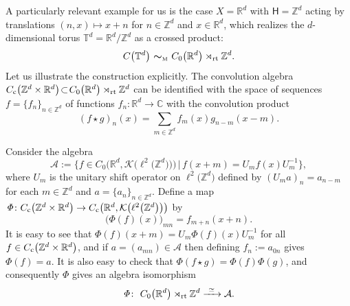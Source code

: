 \documentclass[pdftex]{sigma}
\numberwithin{equation}{section}
\newcommand{\Z}{\zed}
\newcommand{\mbf}[1]{{\boldsymbol {#1} }}
\newcommand{\CK}{\mathcal{K}}
\newcommand{\sfH}{\mathsf{H}}
\newcommand{\rt}{{\rm rt}}
\newcommand{\R}{\real}
\newcommand{\complex}{{\mathbb C}} %
\newcommand{\zed}{{\mathbb Z}} %
\newcommand{\real}{{\mathbb R}} %
\newcommand{\torus}{{\mathbb T}} %
\def\alg{{\mathcal A}}
\begin{document}
\begin{Example}[tori]\label{ex:Moritatori}
A particularly relevant example for us is the case $X=\real^d$ with
$\sfH=\zed^d$ acting by translations $(n,x)\mapsto x+n$ for
$n\in\zed^d$ and $x\in\real^d$, which realizes the
$d$-dimensional torus $\torus^d=\real^d/\zed^d$ as a crossed product:
\[
C\big(\torus^d\big) \ \mbf\sim_{\text{\tiny M}} \ C_0\big(\real^d\big)\rtimes_\rt \zed^d .
\]
Let us illustrate the construction explicitly. The convolution algebra
$C_{\rm c}\big(\Z^d\times\real^d\big)\!\subset\! C_0\big(\R^d\big)\rtimes_\rt\Z^d$ can be
identified with the space of sequences $f=\{f_n\}_{n\in\Z^d}$ of
functions $f_n\colon \real^d\to\complex$ with the convolution product
\[
(f\star g)_n(x) = \sum_{m\in\Z^d} f_m(x) g_{n-m}(x-m) .
\]

Consider the algebra
\[
\alg:=\big\{f\in C_0\big(\real^d,\CK\big(\ell^2\big(\zed^d\big)\big)\big) \, \big| \, f(x+m)
= U_m f(x) U_{m}^{-1}\big\} ,
\]
where $U_m$ is the unitary shift operator on $\ell^2\big(\zed^d\big)$ defined by
$(U_ma)_n=a_{n-m}$ for each $m\in\Z^d$ and $a=\{a_n\}_{n\in\Z^d}$.
Define a map ${\mathit\Phi}\colon C_{\rm c}\big(\Z^d\times\real^d\big)\to
C_{\rm c}\big(\real^d,\CK\big(\ell^2\big(\Z^d\big)\big)\big)$ by
\[
\big({\mathit\Phi}(f)(x)\big)_{mn} = f_{m+n}(x+n) .
\]
It is easy to see that ${\mathit\Phi}(f)(x+m) =
U_m {\mathit\Phi}(f)(x) U_m^{-1}$ for all $f\in C_{\rm
 c}\big(\zed^d\times\real^d\big)$, and if $a=(a_{mn})\in\alg$ then defining
$f_n:=a_{0n}$ gives ${\mathit\Phi}(f)=a$. It is also easy to check that
${\mathit\Phi}(f\star g) = {\mathit\Phi}(f) {\mathit\Phi}(g)$, and consequently
$\mathit\Phi$ gives an algebra isomorphism
\[
{\mathit\Phi}\colon \ C_0\big(\real^d\big)\rtimes_\rt\zed^d \xrightarrow{ \ \simeq \ } \alg .
\]


\end{Example}
\end{document}
